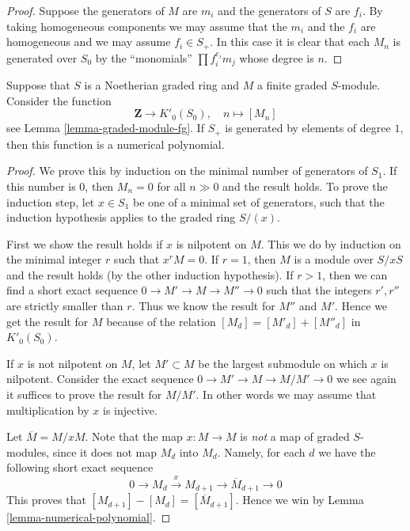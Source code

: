 \begin{proof}
Suppose the generators of $M$ are $m_i$ and the generators
of $S$ are $f_i$. By taking homogeneous components we may
assume that the $m_i$ and the $f_i$ are homogeneous
and we may assume $f_i \in S_{+}$. In this case it is
clear that each $M_n$ is generated over $S_0$
by the ``monomials'' $\prod f_i^{e_i} m_j$ whose
degree is $n$.
\end{proof}

\begin{proposition}
\label{proposition-graded-hilbert-polynomial}
Suppose that $S$ is a Noetherian graded ring
and $M$ a finite graded $S$-module. Consider the
function
$$
\mathbf{Z} \longrightarrow K'_0(S_0), \quad
n \longmapsto [M_n]
$$
see Lemma \ref{lemma-graded-module-fg}.
If $S_{+}$ is generated by elements of degree $1$,
then this function is a numerical polynomial.
\end{proposition}

\begin{proof}
We prove this by induction on the minimal number of
generators of $S_1$. If this number is $0$, then
$M_n = 0$ for all $n \gg 0$ and the result holds.
To prove the induction step, let $x\in S_1$
be one of a minimal set of generators, such that
the induction hypothesis applies to the
graded ring $S/(x)$.

\medskip\noindent
First we show the result holds if $x$ is nilpotent on $M$.
This we do by induction on the minimal integer $r$ such that
$x^r M  = 0$. If $r = 1$, then $M$ is a module over $S/xS$
and the result holds (by the other induction hypothesis).
If $r > 1$, then we can find a short exact sequence
$0 \to M' \to M \to M'' \to 0$ such that the integers
$r', r''$ are strictly smaller than $r$. Thus we know
the result for $M''$ and $M'$. Hence
we get the result for $M$ because of the relation
$
[M_d]  = [M'_d] + [M''_d]
$
in $K'_0(S_0)$.

\medskip\noindent
If $x$ is not nilpotent on $M$, let $M' \subset M$ be
the largest submodule on which $x$ is nilpotent.
Consider the exact sequence $0 \to M' \to M \to M/M' \to 0$
we see again it suffices to prove the result for $M/M'$. In other
words we may assume that multiplication by $x$ is injective.

\medskip\noindent
Let $\overline{M} = M/xM$. Note that the map $x : M \to M$
is {\it not} a map of graded $S$-modules, since it does
not map $M_d$ into $M_d$. Namely, for each $d$ we have the
following short exact sequence
$$
0 \to M_d \xrightarrow{x} M_{d + 1} \to \overline{M}_{d + 1} \to 0
$$
This proves that $[M_{d + 1}] - [M_d] = [\overline{M}_{d + 1}]$.
Hence we win by Lemma \ref{lemma-numerical-polynomial}.
\end{proof}

